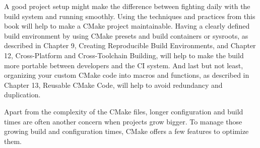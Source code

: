 A good project setup might make the difference between fighting daily with the build system and running smoothly. Using the techniques and practices from this book will help to make a CMake project maintainable. Having a clearly defined build environment by using CMake presets and build containers or sysroots, as described in Chapter 9, Creating Reproducible Build Environments, and Chapter 12, Cross-Platform and Cross-Toolchain Building, will help to make the build more portable between developers and the CI system. And last but not least, organizing your custom CMake code into macros and functions, as described in Chapter 13, Reusable CMake Code, will help to avoid redundancy and duplication.

Apart from the complexity of the CMake files, longer configuration and build times are often another concern when projects grow bigger. To manage those growing build and configuration times, CMake offers a few features to optimize them.

















